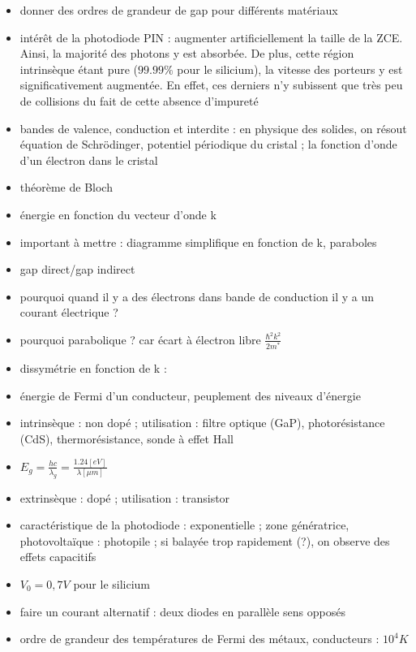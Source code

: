 \begin{remarques} \begin{itemize} 
\item donner des ordres de grandeur de gap pour différents matériaux
\item intérêt de la photodiode PIN : augmenter artificiellement la taille de la ZCE. Ainsi, la majorité des photons y est absorbée. De plus, cette région intrinsèque étant pure ($99.99 \%$ pour le silicium), la vitesse des porteurs y est significativement augmentée. En effet, ces derniers n’y subissent que très peu de collisions du fait de cette absence d’impureté
\item bandes de valence, conduction et interdite : en physique des solides, on résout équation de Schrödinger, potentiel périodique du cristal ; la fonction d'onde d'un électron dans le cristal
\item théorème de Bloch
\item énergie en fonction du vecteur d'onde k 
\item important à mettre : diagramme simplifique en fonction de k, paraboles
\item gap direct/gap indirect
\item pourquoi quand il y a des électrons dans bande de conduction il y a un courant électrique ? 
\item pourquoi parabolique ? car écart à électron libre $\frac{\hbar^2 k^2 }{2m^* }$
\item dissymétrie en fonction de k : 
\item énergie de Fermi d'un conducteur, peuplement des niveaux d'énergie
\item intrinsèque : non dopé ; utilisation : filtre optique (GaP), photorésistance (CdS), thermorésistance, sonde à effet Hall
\item $E_g = \frac{h c}{\lambda_g} = \frac{ 1.24 \left[ eV \right] }{ \lambda \left[ \mu m \right] }$
\item extrinsèque : dopé ; utilisation : transistor 
\item caractéristique de la photodiode : exponentielle ; zone génératrice, photovoltaïque : photopile ; si balayée trop rapidement (?), on observe des effets capacitifs
\item $V_0=0,7V$ pour le silicium
\item faire un courant alternatif : deux diodes en parallèle sens opposés
\item ordre de grandeur des températures de Fermi des métaux, conducteurs : $10^4 K$
\end{itemize} \end{remarques}